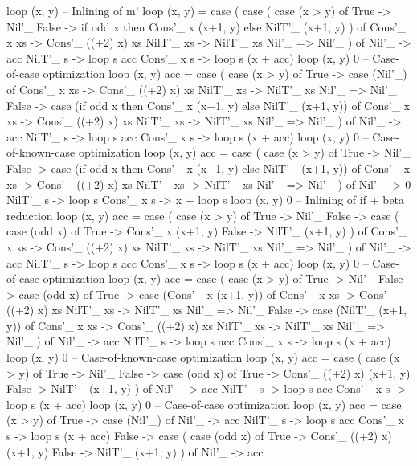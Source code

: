 \begin{spec}
loop (x, y)
-- Inlining of m'
loop (x, y) = case (
  case (
    case (x > y) of
      True -> Nil'_
      False -> if odd x then Cons'_ x (x+1, y) else NilT'_ (x+1, y)
  ) of
    Cons'_ x xs -> Cons'_ ((+2) x) xs
    NilT'_ xs -> NilT'_ xs
    Nil'_ => Nil'_
) of
  Nil'_ -> acc
  NilT'_ s -> loop s acc
  Cons'_ x s -> loop s (x + acc)
loop (x, y) 0
-- Case-of-case optimization
loop (x, y) acc = case (
  case (x > y) of
    True -> case (Nil'_) of
      Cons'_ x xs -> Cons'_ ((+2) x) xs
      NilT'_ xs -> NilT'_ xs
      Nil'_ => Nil'_
    False -> case (if odd x then Cons'_ x (x+1, y) else NilT'_ (x+1, y)) of
      Cons'_ x xs -> Cons'_ ((+2) x) xs
      NilT'_ xs -> NilT'_ xs
      Nil'_ => Nil'_
) of
  Nil'_ -> acc
  NilT'_ s -> loop s acc
  Cons'_ x s -> loop s (x + acc)
loop (x, y) 0
-- Case-of-known-case optimization
loop (x, y) acc = case (
  case (x > y) of
    True -> Nil'_
    False -> case (if odd x then Cons'_ x (x+1, y) else NilT'_ (x+1, y)) of
      Cons'_ x xs -> Cons'_ ((+2) x) xs
      NilT'_ xs -> NilT'_ xs
      Nil'_ => Nil'_
) of
  Nil'_ -> 0
  NilT'_ s -> loop s
  Cons'_ x s -> x + loop s
loop (x, y) 0
-- Inlining of if + beta reduction
loop (x, y) acc = case (
  case (x > y) of
    True -> Nil'_
    False -> case (
      case (odd x) of
        True -> Cons'_ x (x+1, y) 
        False -> NilT'_ (x+1, y)
    ) of
      Cons'_ x xs -> Cons'_ ((+2) x) xs
      NilT'_ xs -> NilT'_ xs
      Nil'_ => Nil'_
) of
  Nil'_ -> acc
  NilT'_ s -> loop s acc
  Cons'_ x s -> loop s (x + acc)
loop (x, y) 0
-- Case-of-case optimization
loop (x, y) acc = case (
  case (x > y) of
    True -> Nil'_
    False ->  case (odd x) of
      True -> case (Cons'_ x (x+1, y)) of
    Cons'_ x xs -> Cons'_ ((+2) x) xs
    NilT'_ xs -> NilT'_ xs
    Nil'_ => Nil'_
      False -> case (NilT'_ (x+1, y)) of
        Cons'_ x xs -> Cons'_ ((+2) x) xs
        NilT'_ xs -> NilT'_ xs
        Nil'_ => Nil'_
) of
  Nil'_ -> acc
  NilT'_ s -> loop s acc
  Cons'_ x s -> loop s (x + acc)
loop (x, y) 0
-- Case-of-known-case optimization
loop (x, y) acc = case (
  case (x > y) of
    True -> Nil'_
    False ->  case (odd x) of
      True -> Cons'_ ((+2) x) (x+1, y)
      False -> NilT'_ (x+1, y)
  ) of
    Nil'_ -> acc
    NilT'_ s -> loop s acc
    Cons'_ x s -> loop s (x + acc)
loop (x, y) 0
-- Case-of-case optimization
loop (x, y) acc = case (x > y) of
  True -> case (Nil'_) of
    Nil'_ -> acc
    NilT'_ s -> loop s acc
    Cons'_ x s -> loop s (x + acc)
  False -> case (
    case (odd x) of
      True -> Cons'_ ((+2) x) (x+1, y)
      False -> NilT'_ (x+1, y)
  ) of
    Nil'_ -> acc

\end{spec}
